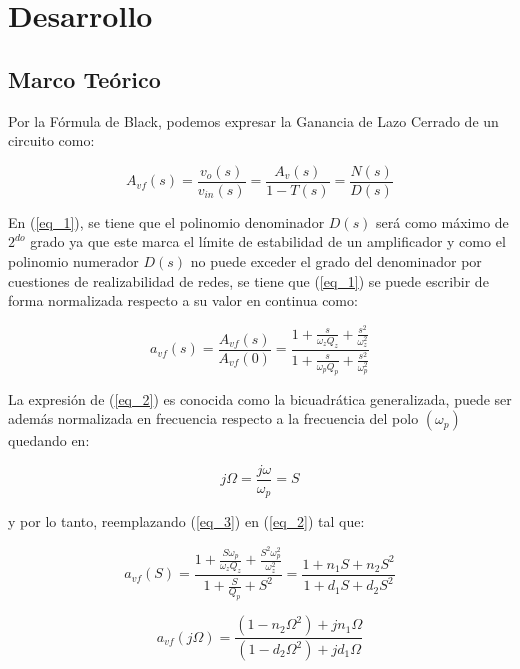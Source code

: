 \documentclass[12pt,a4paper]{article}
\begin{document}
\section{Desarrollo}
\subsection{Marco Teórico}
Por la Fórmula de Black, podemos expresar la Ganancia de Lazo Cerrado de un circuito como:

\begin{equation}
    \label{eq_1}
    A_{vf}(s) = \frac{v_{o}(s)}{v_{in}(s)} = \frac{A_{v}(s)}{1-T(s)} = \frac{N(s)}{D(s)}
\end{equation}

En (\ref{eq_1}), se tiene que el polinomio denominador $D(s)$ será como máximo de $2^{do}$ grado ya que este marca el límite de estabilidad de un amplificador y como el polinomio numerador $D(s)$ no puede exceder el grado del denominador por cuestiones de realizabilidad de redes, se tiene que (\ref{eq_1}) se puede escribir de forma normalizada respecto a su valor en continua como:

\begin{equation}
    \label{eq_2}
    a_{vf}(s) = \frac{A_{vf}(s)}{A_{vf}(0)} = \frac{1 + \frac{s}{\omega_z Q_z} + \frac{s^2}{\omega_z^2}}{1 + \frac{s}{\omega_p Q_p} + \frac{s^2}{\omega_p^2}}
\end{equation}

La expresión de (\ref{eq_2}) es conocida como la bicuadrática generalizada, puede ser además normalizada en frecuencia respecto a la frecuencia del polo $(\omega_p)$ quedando en:

\begin{equation}
    \label{eq_3}
    j\Omega = \frac{j\omega}{\omega_p} =S 
\end{equation}

y por lo tanto, reemplazando (\ref{eq_3}) en (\ref{eq_2}) tal que:

\begin{equation}
    \label{eq_4}
    a_{vf}(S) = \frac{1 + \frac{S \omega_p }{\omega_z Q_z} + \frac{S^2 \omega_p^2}{\omega_z^2}}{1 + \frac{S}{Q_p} + S^2} = \frac{1 + n_1 S + n_2 S^2}{1 + d_1 S + d_2 S^2}
\end{equation}
 
\begin{equation}
    \label{eq_5}
    a_{vf}(j\Omega) = \frac{(1 - n_2 \Omega^2) + jn_1 \Omega}{(1 - d_2 \Omega^2) + jd_1 \Omega}
\end{equation}
\end{document}
